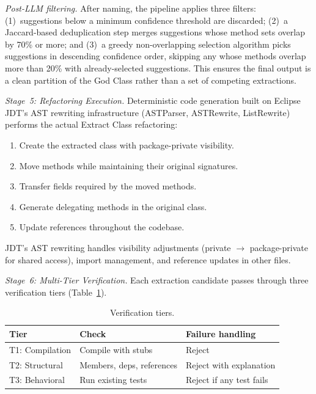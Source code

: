 \documentclass[sigconf]{acmart}
\begin{document}
\textit{Post-LLM filtering.}  After naming, the pipeline applies three
filters: (1)~suggestions below a minimum confidence threshold are discarded;
(2)~a Jaccard-based deduplication step merges suggestions whose method sets
overlap by 70\% or more; and (3)~a greedy non-overlapping selection algorithm
picks suggestions in descending confidence order, skipping any whose methods
overlap more than 20\% with already-selected suggestions. This ensures the
final output is a clean partition of the God Class rather than a set of
competing extractions.

\textit{Stage~5: Refactoring Execution.}  Deterministic code generation built
on Eclipse JDT's AST rewriting infrastructure (ASTParser, ASTRewrite,
ListRewrite) performs the actual Extract Class refactoring:
\begin{enumerate}
  \item Create the extracted class with package-private visibility.
  \item Move methods while maintaining their original signatures.
  \item Transfer fields required by the moved methods.
  \item Generate delegating methods in the original class.
  \item Update references throughout the codebase.
\end{enumerate}
JDT's AST rewriting handles visibility adjustments (private $\to$
package-private for shared access), import management, and reference updates in
other files.

\textit{Stage~6: Multi-Tier Verification.}  Each extraction candidate passes
through three verification tiers (Table~\ref{tab:verification-tiers}).

\begin{table}[htbp]
\centering\small
\caption{Verification tiers.}
\label{tab:verification-tiers}
\begin{tabularx}{\columnwidth}{@{}llX@{}}
\toprule
\textbf{Tier} & \textbf{Check} & \textbf{Failure handling} \\
\midrule
T1: Compilation & Compile with stubs & Reject \\
T2: Structural  & Members, deps, references & Reject with explanation \\
T3: Behavioral  & Run existing tests & Reject if any test fails \\
\bottomrule
\end{tabularx}
\end{table}
\end{document}
